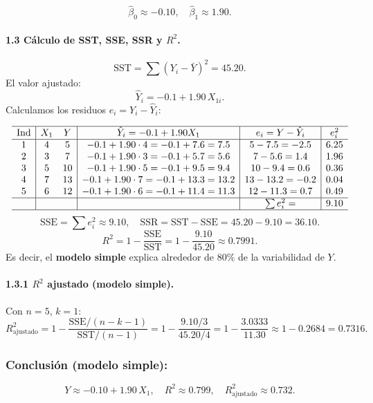 \documentclass[10pt,a4paper]{article}
\begin{document}
\[
\boxed{
\widehat{\beta}_0 \approx -0.10,
\quad
\widehat{\beta}_1 \approx 1.90.
}
\]

\paragraph{1.3 C\'alculo de SST, SSE, SSR y $R^2$.}

\[
\text{SST}
= \sum (Y_i - \bar{Y})^2
= 45.20.
\]
El valor ajustado: 
\[
\hat{Y}_i
= -0.1 +1.90\,X_{1i}.
\]
Calculamos los residuos $e_i = Y_i - \hat{Y}_i$:

\[
\begin{array}{c|cc|c|c|c}
\hline
\text{Ind} & X_1 & Y 
& \hat{Y}_i = -0.1 +1.90X_1
& e_i= Y-\hat{Y}_i
& e_i^2
\\\hline
1 & 4 & 5 
& -0.1 +1.90\cdot4 =-0.1 +7.6=7.5
& 5-7.5=-2.5
& 6.25
\\
2 & 3 &7
& -0.1 +1.90\cdot3 =-0.1 +5.7=5.6
& 7-5.6=1.4
& 1.96
\\
3 & 5 &10
& -0.1 +1.90\cdot5 =-0.1 +9.5=9.4
& 10-9.4=0.6
& 0.36
\\
4 & 7 &13
& -0.1 +1.90\cdot7 =-0.1 +13.3=13.2
& 13-13.2=-0.2
& 0.04
\\
5 & 6 &12
& -0.1 +1.90\cdot6 =-0.1 +11.4=11.3
& 12-11.3=0.7
& 0.49
\\
\hline
& & & & \sum e_i^2= & 9.10
\\\hline
\end{array}
\]
\[
\text{SSE} = \sum e_i^2 \approx 9.10,
\quad
\text{SSR} = \text{SST} - \text{SSE} = 45.20 -9.10=36.10.
\]
\[
R^2
= 1 - \frac{\text{SSE}}{\text{SST}}
= 1 - \frac{9.10}{45.20}
\approx 0.7991.
\]
Es decir, el \textbf{modelo simple} explica alrededor de $80\%$ de la variabilidad de $Y$.

\paragraph{1.3.1 $R^2$ ajustado (modelo simple).}

Con $n=5$, $k=1$:
\[
R_{\text{ajustado}}^2
= 1 - \frac{\text{SSE}/(n - k -1)}{\text{SST}/(n-1)}
= 1 - \frac{9.10/3}{45.20/4}
= 1 - \frac{3.0333}{11.30}
\approx 1 -0.2684
= 0.7316.
\]

\subsubsection*{Conclusi\'on (modelo simple):}
\[
Y \approx -0.10 +1.90\,X_1,
\quad
R^2 \approx 0.799,
\quad
R_{\text{ajustado}}^2 \approx 0.732.
\]
\end{document}
